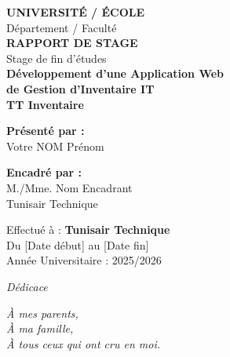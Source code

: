 \documentclass[12pt,a4paper]{report}
\begin{document}
\begin{titlepage}
    \centering
    \vspace*{1cm}
    
    
    {\LARGE \textbf{UNIVERSITÉ / ÉCOLE}}\\[0.5cm]
    {\large Département / Faculté}\\[2cm]
    
    {\huge \textbf{RAPPORT DE STAGE}}\\[0.5cm]
    {\Large Stage de fin d'études}\\[2cm]
    
    {\Huge \textbf{Développement d'une Application Web}}\\[0.3cm]
    {\Huge \textbf{de Gestion d'Inventaire IT}}\\[0.5cm]
    {\LARGE \textbf{TT Inventaire}}\\[3cm]
    
    \begin{minipage}{0.45\textwidth}
        \begin{flushleft}
            \textbf{Présenté par :}\\
            Votre NOM Prénom
        \end{flushleft}
    \end{minipage}
    \hfill
    \begin{minipage}{0.45\textwidth}
        \begin{flushright}
            \textbf{Encadré par :}\\
            M./Mme. Nom Encadrant\\
            Tunisair Technique
        \end{flushright}
    \end{minipage}
    
    \vfill
    
    {\large Effectué à : \textbf{Tunisair Technique}}\\[0.3cm]
    {\large Du [Date début] au [Date fin]}\\[0.5cm]
    {\large Année Universitaire : 2025/2026}
    
\end{titlepage}

\newpage
\thispagestyle{empty}
\mbox{}

\newpage
\thispagestyle{empty}
\vspace*{5cm}
\begin{center}
    \textit{\Large Dédicace}
\end{center}
\vspace{2cm}
\begin{flushright}
    \textit{À mes parents,\\
    À ma famille,\\
    À tous ceux qui ont cru en moi.}
\end{flushright}
\end{document}
